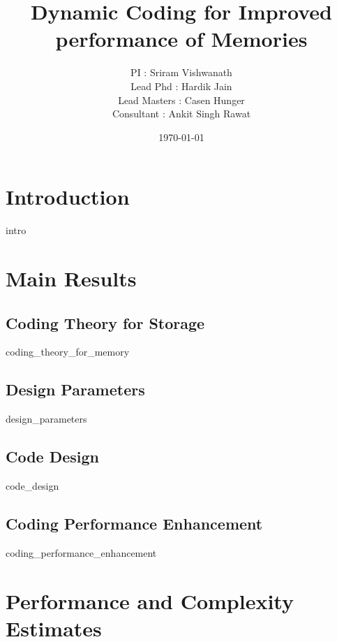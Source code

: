 \documentclass[12pt,single-column]{article}
\begin{document}
\title{Dynamic Coding for Improved performance of Memories }
\author{
PI : Sriram Vishwanath\\
Lead Phd : Hardik Jain\\
Lead Masters : Casen Hunger \\
Consultant : Ankit Singh Rawat 
}

\date{\normalsize\today}  %

\maketitle

\begin{abstract}
 
\end{abstract}
\section{Introduction}
\label{sec:intro}
 {intro}

\section{Main Results}
\label{sec:main_results}

\subsection{Coding Theory for Storage}
\label{sec:coding_theory_for_storage}
 {coding_theory_for_memory}

\subsection{Design Parameters}
\label{sec:design_parameters}
 {design_parameters}

\subsection{Code Design}
\label{sec:code_design}
 {code_design}

\subsection{Coding Performance Enhancement}
\label{sec:coding_performance_enhancement}
 {coding_performance_enhancement}

\section{Performance and Complexity Estimates}
\label{sec:summary_table}

\end{document}
